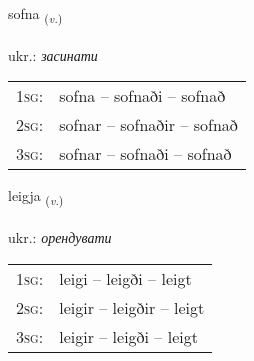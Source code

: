 \documentclass[frontgrid, backgrid]{flacards}\usepackage[]{graphicx}\usepackage[]{xcolor}
\begin{document}
\renewcommand{\flhead}{\vskip5pt \fboxsep=0pt {\small\bfseries\footnotesize Sagnorð | дієслово}}
\renewcommand{\fcfoot}{\vskip5pt \fboxsep=0pt \hspace{2pt}{\small\bfseries\footnotesize 3K}}

\renewcommand{\blhead}{\vskip5pt {\small\bfseries\footnotesize Sagnorð | дієслово }}
\renewcommand{\bcfoot}{\vskip5pt \hspace{2pt}{\small\bfseries\footnotesize 3K}}


{sofna \small{\textsubscript{(\textit{v.})}} \\[1ex] %
\textphonetic{[sɔpna]} \\
ukr.: \emph{засинати} \\  [2ex]
\renewcommand*{\arraystretch}{0.8}
\begin{tabular}{p{1cm}l}
\textsc{1sg}: & sofna -- sofnaði -- sofnað \\ 
\textsc{2sg}: & sofnar -- sofnaðir -- sofnað \\ 
\textsc{3sg}: & sofnar -- sofnaði -- sofnað \\ 
\end{tabular}
}

\renewcommand{\flhead}{\vskip5pt \fboxsep=0pt {\small\bfseries\footnotesize Sagnorð | дієслово}}
\renewcommand{\fcfoot}{\vskip5pt \fboxsep=0pt \hspace{2pt}{\small\bfseries\footnotesize 3K}}

\renewcommand{\blhead}{\vskip5pt {\small\bfseries\footnotesize Sagnorð | дієслово }}
\renewcommand{\bcfoot}{\vskip5pt \hspace{2pt}{\small\bfseries\footnotesize 3K}}


{leigja \small{\textsubscript{(\textit{v.})}} \\[1ex] %
\textphonetic{[leija]} \\
ukr.: \emph{орендувати} \\  [2ex]
\renewcommand*{\arraystretch}{0.8}
\begin{tabular}{p{1cm}l}
\textsc{1sg}: & leigi -- leigði -- leigt \\ 
\textsc{2sg}: & leigir -- leigðir -- leigt \\ 
\textsc{3sg}: & leigir -- leigði -- leigt \\ 
\end{tabular}
}
\end{document}

